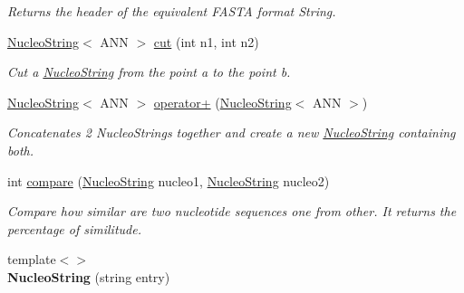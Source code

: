 \begin{DoxyCompactItemize}
\begin{DoxyCompactList}\small\item\em Returns the header of the equivalent F\-A\-S\-T\-A format String. \end{DoxyCompactList}\item 
\hypertarget{class_nucleo_string_a6ea38589b348ed71f1e8a43a4968ea22}{\hyperlink{class_nucleo_string}{Nucleo\-String}$<$ A\-N\-N $>$ \hyperlink{class_nucleo_string_a6ea38589b348ed71f1e8a43a4968ea22}{cut} (int n1, int n2)}\label{class_nucleo_string_a6ea38589b348ed71f1e8a43a4968ea22}

\begin{DoxyCompactList}\small\item\em Cut a \hyperlink{class_nucleo_string}{Nucleo\-String} from the point a to the point b. \end{DoxyCompactList}\item 
\hypertarget{class_nucleo_string_a27103d8de88bb1b0fd03773375b8f9f4}{\hyperlink{class_nucleo_string}{Nucleo\-String}$<$ A\-N\-N $>$ \hyperlink{class_nucleo_string_a27103d8de88bb1b0fd03773375b8f9f4}{operator+} (\hyperlink{class_nucleo_string}{Nucleo\-String}$<$ A\-N\-N $>$)}\label{class_nucleo_string_a27103d8de88bb1b0fd03773375b8f9f4}

\begin{DoxyCompactList}\small\item\em Concatenates 2 Nucleo\-Strings together and create a new \hyperlink{class_nucleo_string}{Nucleo\-String} containing both. \end{DoxyCompactList}\item 
\hypertarget{class_nucleo_string_a38d19bc6af6d35cc5e8ec4a38b976c35}{int \hyperlink{class_nucleo_string_a38d19bc6af6d35cc5e8ec4a38b976c35}{compare} (\hyperlink{class_nucleo_string}{Nucleo\-String} nucleo1, \hyperlink{class_nucleo_string}{Nucleo\-String} nucleo2)}\label{class_nucleo_string_a38d19bc6af6d35cc5e8ec4a38b976c35}

\begin{DoxyCompactList}\small\item\em Compare how similar are two nucleotide sequences one from other. It returns the percentage of similitude. \end{DoxyCompactList}\item 
\hypertarget{class_nucleo_string_aac3df498cd82264e26a318570f2a5588}{{\footnotesize template$<$$>$ }\\{\bfseries Nucleo\-String} (string entry)}\label{class_nucleo_string_aac3df498cd82264e26a318570f2a5588}


\end{DoxyCompactItemize}
